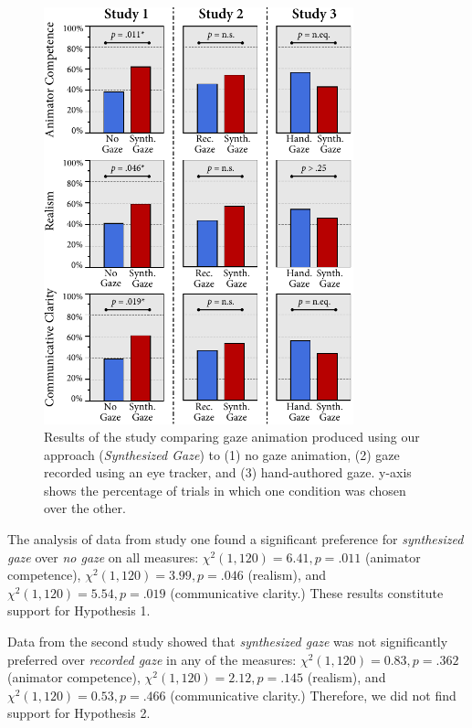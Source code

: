 \begin{figure}
\centering
\includegraphics[width=0.8\textwidth]{gazeauthoring/Figures/StudyResults.pdf}
\caption{Results of the study comparing gaze animation produced using our approach (\emph{Synthesized Gaze}) to (1) no gaze animation, (2) gaze recorded using an eye tracker, and (3) hand-authored gaze. y-axis shows the percentage of trials in which one condition was chosen over the other.}
\label{fig:GazeAnimationQualityResults}
\end{figure}

The analysis of data from study one found a significant preference for \emph{synthesized gaze} over \emph{no gaze} on all measures: $\chi^2(1, 120) = 6.41, p = .011$ (animator competence), $\chi^2(1, 120) = 3.99, p = .046$ (realism), and $\chi^2(1, 120) = 5.54, p = .019$ (communicative clarity.) These results constitute support for Hypothesis 1.

Data from the second study showed that \emph{synthesized gaze} was not significantly preferred over \emph{recorded gaze} in any of the measures: $\chi^2(1, 120) = 0.83, p = .362$ (animator competence), $\chi^2(1, 120) = 2.12, p = .145$ (realism), and $\chi^2(1, 120) = 0.53, p = .466$ (communicative clarity.) Therefore, we did not find support for Hypothesis 2.


